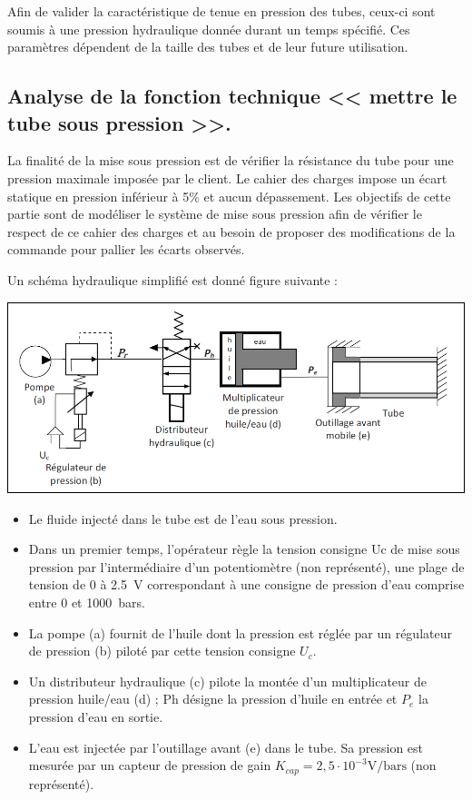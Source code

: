 \documentclass[10pt,fleqn]{article} %
\begin{document}
Afin de valider la caractéristique de tenue en pression des tubes, ceux-ci sont soumis à une pression hydraulique donnée durant un temps spécifié. Ces paramètres dépendent de la taille des tubes et de leur future utilisation.

\subsection{Analyse de la fonction technique << mettre le tube sous pression >>.}

La finalité de la mise sous pression est de vérifier la résistance du tube pour une pression maximale imposée par le client. Le cahier des charges impose un écart statique en pression inférieur à 5\% et aucun dépassement. 
Les objectifs de cette partie sont de modéliser le système de mise sous pression afin de vérifier le respect de ce cahier des charges et au besoin de proposer des modifications de la commande pour pallier les écarts observés.

Un schéma hydraulique simplifié est donné figure suivante :
\begin{center}
\includegraphics[width=\linewidth]{images_02/fig_01}
\end{center}


\begin{itemize}
\item Le fluide injecté dans le tube est de l’eau sous pression.
\item Dans un premier temps, l’opérateur règle la tension consigne Uc de mise sous pression par l’intermédiaire d’un potentiomètre (non représenté), une plage de tension de 0 à \SI{2,5}{V} correspondant à une consigne de pression d’eau comprise entre 0 et \SI{1000}{bars}.
\item La pompe (a) fournit de l’huile dont la pression est réglée par un régulateur de pression (b) piloté par cette tension consigne $U_c$.
\item Un distributeur hydraulique (c) pilote la montée d’un multiplicateur de pression huile/eau (d) ;
Ph désigne la pression d’huile en entrée et $P_e$ la  pression d’eau en sortie.
\item L’eau est injectée par l’outillage avant (e) dans le tube. Sa pression est mesurée par un capteur de pression de gain $K_{cap} = 2,5\cdot 10^{-3} \text{V/bars}$  (non représenté).
\end{itemize}
\end{document}
